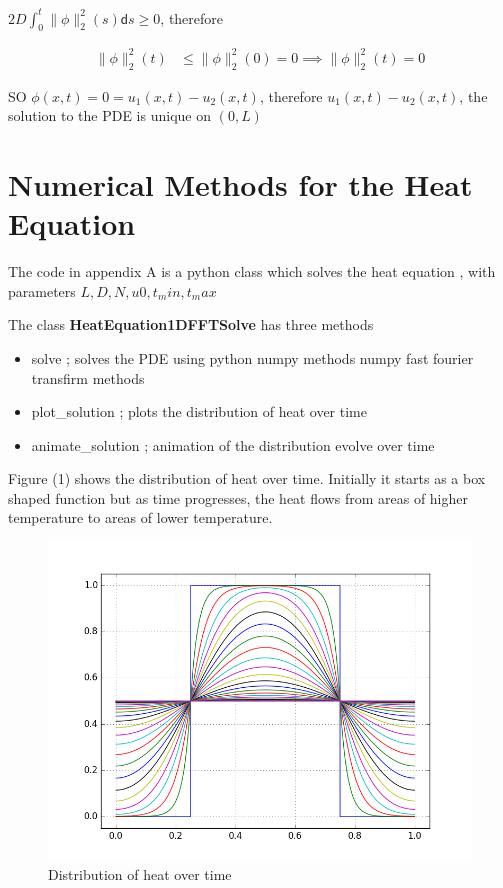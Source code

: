 \documentclass[a4paper]{article}
\begin{document}
$2D \int_{0}^{t} \parallel \phi \parallel_{2}^{2}(s) \mathsf{d}s \ge 0$, therefore

\begin{align*}
\parallel \phi \parallel_{2}^{2} (t) &\le \parallel \phi \parallel_{2}^{2} (0) = 0 \implies  \parallel \phi \parallel_{2}^{2} (t) = 0
\end{align*}

SO $\phi(x,t) = 0 = u_{1}(x,t) - u_{2}(x,t)$, therefore $u_{1}(x,t) - u_{2}(x,t)$, the solution to the PDE is unique on $(0, L)$


\section{Numerical Methods for the Heat Equation}

The code in appendix A is a python class which solves the heat equation , with parameters $L, D, N, u0, t_min, t_max$

\hspace{5mm}

The class \textbf{HeatEquation1DFFTSolve} has three methods

\begin{itemize}
 \item solve ; solves the PDE using python numpy methods numpy fast fourier transfirm methods
 \item plot\_solution ; plots the distribution of heat over time
 \item animate\_solution ; animation of the distribution evolve over time
\end{itemize}

Figure (1) shows the distribution of heat over time. Initially it starts as a box shaped function but as time progresses, the heat flows from areas of higher temperature
to areas of lower temperature.

\begin{figure}[H]
\centering
\includegraphics[width=1\textwidth]{solution-plot.png}
\caption{\label{fig:solution-plot}Distribution of heat over time}
\end{figure}
\end{document}

